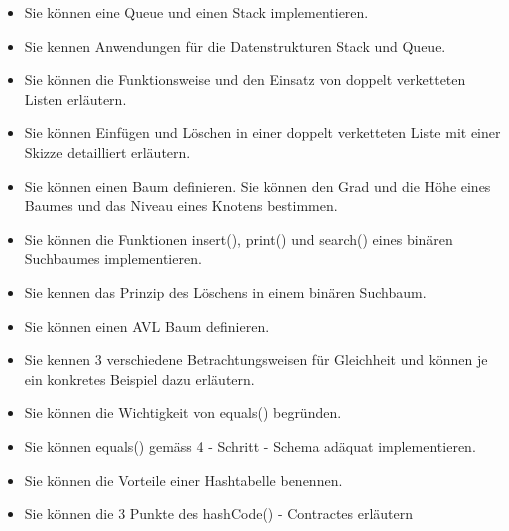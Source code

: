 \begin{itemize}
  \item Sie können eine Queue und einen Stack implementieren. \\

  \item Sie kennen Anwendungen für die Datenstrukturen Stack und Queue. \\

  \item Sie können die Funktionsweise und den Einsatz von doppelt verketteten Listen erläutern. \\

  \item Sie können Einfügen und Löschen in einer doppelt verketteten Liste mit einer Skizze detailliert erläutern. \\

  \item Sie können einen Baum definieren. Sie können den Grad und die Höhe eines Baumes und das Niveau eines Knotens bestimmen. \\

  \item Sie können die Funktionen insert(), print() und search() eines binären Suchbaumes implementieren. \\

  \item Sie kennen das Prinzip des Löschens in einem binären Suchbaum. \\

  \item Sie können einen AVL Baum definieren. \\

  \item Sie kennen 3 verschiedene Betrachtungsweisen für Gleichheit und können je ein konkretes Beispiel dazu erläutern. \\

  \item Sie können die Wichtigkeit von equals() begründen. \\

  \item Sie können equals() gemäss 4 - Schritt - Schema adäquat implementieren. \\

  \item Sie können die Vorteile einer Hashtabelle benennen. \\

  \item Sie können die 3 Punkte des hashCode() - Contractes erläutern \\


\end{itemize}
